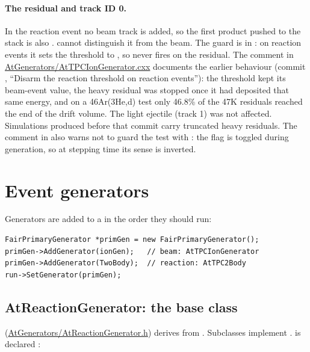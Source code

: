 \paragraph{The residual and track ID 0.} In the reaction event no beam track is added, so the first
product pushed to the stack is also .  cannot distinguish it from the
beam. The guard is in : on reaction events it sets the threshold
to , so  never fires on the
residual. The comment in \url{AtGenerators/AtTPCIonGenerator.cxx} documents the earlier behaviour
(commit , ``Disarm the reaction threshold on reaction events''): the threshold kept
its beam-event value, the heavy residual was stopped once it had deposited that same energy, and
on a 46Ar(3He,d) test only 46.8\% of the 47K residuals reached the end of the drift volume. The
light ejectile (track 1) was not affected. Simulations produced before that commit carry truncated
heavy residuals. The comment in  also warns not to guard the test
with : the flag is toggled during generation, so at stepping
time its sense is inverted.

\section{Event generators}
\label{sec:sim:generators}

Generators are added to a  in the order they should run:

\begin{verbatim}
FairPrimaryGenerator *primGen = new FairPrimaryGenerator();
primGen->AddGenerator(ionGen);   // beam: AtTPCIonGenerator
primGen->AddGenerator(TwoBody);  // reaction: AtTPC2Body
run->SetGenerator(primGen);
\end{verbatim}

\subsection{AtReactionGenerator: the base class}

 (\url{AtGenerators/AtReactionGenerator.h}) derives from
. Subclasses implement .
 is declared :

